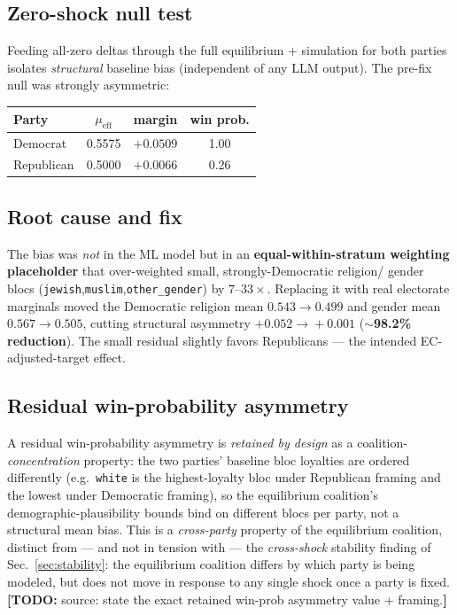 \documentclass[11pt]{article}
\newcommand{\todo}[1]{{\color{red}\textbf{[TODO:} #1\textbf{]}}}
\begin{document}
\subsection{Zero-shock null test}
Feeding all-zero deltas through the full equilibrium + simulation for both
parties isolates \emph{structural} baseline bias (independent of any LLM output).
The pre-fix null was strongly asymmetric:
\begin{center}
\begin{tabular}{lccc}
\toprule
Party & $\mu_{\text{eff}}$ & margin & win prob. \\
\midrule
Democrat   & 0.5575 & $+0.0509$ & 1.00 \\
Republican & 0.5000 & $+0.0066$ & 0.26 \\
\bottomrule
\end{tabular}
\end{center}

\subsection{Root cause and fix}\label{sec:rootcause}
The bias was \emph{not} in the ML model but in an \textbf{equal-within-stratum
weighting placeholder} that over-weighted small, strongly-Democratic religion/
gender blocs (\texttt{jewish},\texttt{muslim},\texttt{other\_gender}) by
$7$--$33\times$. Replacing it with real electorate marginals moved the Democratic
religion mean $0.543\!\rightarrow\!0.499$ and gender mean
$0.567\!\rightarrow\!0.505$, cutting structural asymmetry
$+0.052\!\rightarrow\!+0.001$ (\textbf{$\sim$98.2\% reduction}). The small
residual slightly favors Republicans --- the intended EC-adjusted-target effect.

\subsection{Residual win-probability asymmetry}
A residual win-probability asymmetry is \emph{retained by design} as a
coalition-\emph{concentration} property: the two parties' baseline bloc
loyalties are ordered differently (e.g.\ \texttt{white} is the
highest-loyalty bloc under Republican framing and the lowest under
Democratic framing), so the equilibrium coalition's demographic-plausibility
bounds bind on different blocs per party, not a structural mean bias. This
is a \emph{cross-party} property of the equilibrium coalition, distinct from
--- and not in tension with --- the \emph{cross-shock} stability finding of
Sec.~\ref{sec:stability}: the equilibrium coalition differs by which party
is being modeled, but does not move in response to any single shock once a
party is fixed.
\todo{source: state the exact retained win-prob asymmetry value + framing.}
\end{document}
